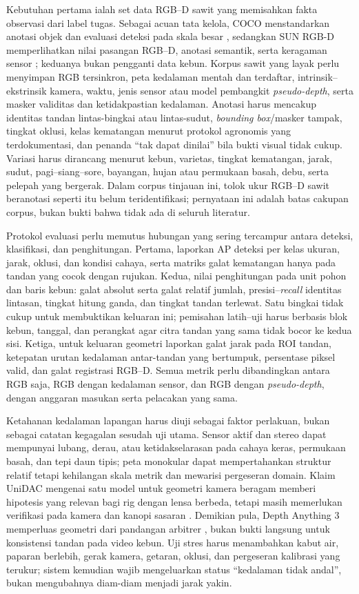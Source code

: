 Kebutuhan pertama ialah set data RGB--D sawit yang memisahkan fakta observasi
dari label tugas. Sebagai acuan tata kelola, COCO menstandarkan anotasi objek
dan evaluasi deteksi pada skala besar \cite{lin2014coco}, sedangkan SUN RGB-D
memperlihatkan nilai pasangan RGB--D, anotasi semantik, serta keragaman sensor
\cite{song2015sunrgbd}; keduanya bukan pengganti data kebun. Korpus sawit yang
layak perlu menyimpan RGB tersinkron, peta kedalaman mentah dan terdaftar,
intrinsik--ekstrinsik kamera, waktu, jenis sensor atau model pembangkit
\textit{pseudo-depth}, serta masker validitas dan ketidakpastian kedalaman.
Anotasi harus mencakup identitas tandan lintas-bingkai atau lintas-sudut,
\textit{bounding box}/masker tampak, tingkat oklusi, kelas kematangan menurut
protokol agronomis yang terdokumentasi, dan penanda ``tak dapat dinilai'' bila
bukti visual tidak cukup. Variasi harus dirancang menurut kebun, varietas,
tingkat kematangan, jarak, sudut, pagi--siang--sore, bayangan, hujan atau
permukaan basah, debu, serta pelepah yang bergerak. Dalam corpus tinjauan ini,
tolok ukur RGB--D sawit beranotasi seperti itu belum teridentifikasi; pernyataan
ini adalah batas cakupan corpus, bukan bukti bahwa tidak ada di seluruh
literatur.

Protokol evaluasi perlu memutus hubungan yang sering tercampur antara deteksi,
klasifikasi, dan penghitungan. Pertama, laporkan AP deteksi per kelas ukuran,
jarak, oklusi, dan kondisi cahaya, serta matriks galat kematangan hanya pada
tandan yang cocok dengan rujukan. Kedua, nilai penghitungan pada unit pohon dan
baris kebun: galat absolut serta galat relatif jumlah, presisi--\textit{recall}
identitas lintasan, tingkat hitung ganda, dan tingkat tandan terlewat. Satu
bingkai tidak cukup untuk membuktikan keluaran ini; pemisahan latih--uji harus
berbasis blok kebun, tanggal, dan perangkat agar citra tandan yang sama tidak
bocor ke kedua sisi. Ketiga, untuk keluaran geometri laporkan galat jarak pada
ROI tandan, ketepatan urutan kedalaman antar-tandan yang bertumpuk, persentase
piksel valid, dan galat registrasi RGB--D. Semua metrik perlu dibandingkan
antara RGB saja, RGB dengan kedalaman sensor, dan RGB dengan \textit{pseudo-depth},
dengan anggaran masukan serta pelacakan yang sama.

Ketahanan kedalaman lapangan harus diuji sebagai faktor perlakuan, bukan sebagai
catatan kegagalan sesudah uji utama. Sensor aktif dan stereo dapat mempunyai
lubang, derau, atau ketidakselarasan pada cahaya keras, permukaan basah, dan
tepi daun tipis; peta monokular dapat mempertahankan struktur relatif tetapi
kehilangan skala metrik dan mewarisi pergeseran domain. Klaim UniDAC mengenai
satu model untuk geometri kamera beragam memberi hipotesis yang relevan bagi
rig dengan lensa berbeda, tetapi masih memerlukan verifikasi pada kamera dan
kanopi sasaran \cite{ganesan2026unidac}. Demikian pula, Depth Anything 3
memperluas geometri dari pandangan arbitrer \cite{lin2025depthanything3},
bukan bukti langsung untuk konsistensi tandan pada video kebun. Uji stres harus
menambahkan kabut air, paparan berlebih, gerak kamera, getaran, oklusi, dan
pergeseran kalibrasi yang terukur; sistem kemudian wajib mengeluarkan status
``kedalaman tidak andal'', bukan mengubahnya diam-diam menjadi jarak yakin.

